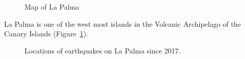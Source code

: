 \documentclass[
]{agujournal2019}
\begin{document}
\begin{figure}


\caption{\label{fig-map}Map of La Palma}

\end{figure}%

La Palma is one of the west most islands in the Volcanic Archipelago of
the Canary Islands (Figure~\ref{fig-map}).

\begin{figure}[H]


\caption{\label{fig-spatial-plot}Locations of earthquakes on La Palma
since 2017.}

\end{figure}%
\end{document}
